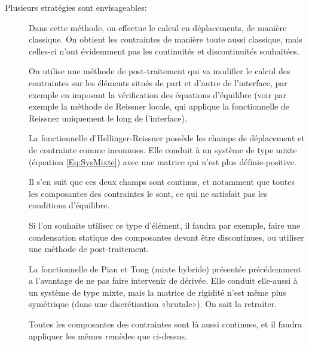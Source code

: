 \bigskip
Plusieurs stratégies sont envisageables:
\begin{description}
\item[]

	Dans cette méthode, on effectue le calcul en déplacements, de manière classique. 	On obtient les contraintes de manière toute aussi classique, mais celles-ci 	n'ont évidemment pas les continuités et discontinuités souhaitées.

	On utilise une méthode de post-traitement qui va modifier le calcul des contraintes 	sur les éléments situés de part et d'autre de l'interface, par exemple 	en imposant la vérification des équations d'équilibre (voir par exemple 	la méthode de Reissner locale, qui applique la fonctionnelle de Reissner uniquement 	le long de l'interface).\item[]

	La fonctionnelle d'Hellinger-Reissner possède les champs de déplacement et de 	contrainte comme inconnues. Elle conduit à un système de type mixte (équation \eqref{Eq:SysMixte}) avec une matrice qui n'est plus définie-positive.

	Il s'en suit que ces deux champs sont continus, et notamment que toutes les 	composantes des contraintes le sont, ce qui ne satisfait pas les conditions d'équilibre.

	Si l'on souhaite utiliser ce type d'élément, il faudra par exemple, faire une condensation statique des composantes devant être discontinues, ou utiliser une méthode de post-traitement.

	\item[]

	La fonctionnelle de Pian et Tong (mixte hybride) présentée précédemment a l'avantage de ne pas faire intervenir de dérivée. Elle conduit elle-aussi à un système de type mixte, mais la matrice de rigidité n'est même plus symétrique (dans une discrétisation «brutale»). On sait la retraiter.

	Toutes les composantes des contraintes sont là aussi continues, et il faudra appliquer les mêmes remèdes que ci-dessus.


\end{description}
